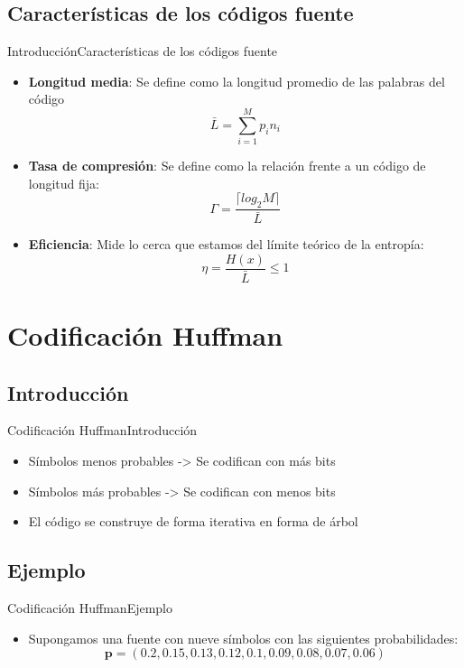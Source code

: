 \documentclass[10pt,compress]{beamer} %
\begin{document}
\subsection{Características de los códigos fuente}
\begin{frame}{Introducción}{Características de los códigos fuente}
  \begin{itemize}
    \item {\bf Longitud media}: Se define como la longitud promedio de las palabras del código
    \begin{displaymath}
      \bar{L} = \sum_{i=1}^M p_i n_i	
    \end{displaymath}
    \item {\bf Tasa de compresión}: Se define como la relación frente a un código de longitud fija:
    \begin{displaymath}
      \Gamma = \frac{\lceil log_2 M \rceil}{\bar{L}}	
    \end{displaymath}
    \item {\bf Eficiencia}: Mide lo cerca que estamos del límite teórico de la entropía:
    \begin{displaymath}
      \eta = \frac{H(x)}{\bar{L}} \leq 1	
    \end{displaymath}
  \end{itemize}
\end{frame}


\section{Codificación Huffman}
\subsection{Introducción}

\begin{frame}{Codificación Huffman}{Introducción}
  \begin{itemize}
    \item Símbolos menos probables -> Se codifican con más bits
    \item Símbolos más probables -> Se codifican con menos bits
    \item El código se construye de forma iterativa en forma de árbol
  \end{itemize}
\end{frame}

\subsection{Ejemplo}
\begin{frame}{Codificación Huffman}{Ejemplo}
  \begin{itemize}
    \item Supongamos una fuente con nueve símbolos con las siguientes probabilidades:
    \begin{displaymath}
      \mathbf{p} = (0.2, 0.15, 0.13, 0.12, 0.1, 0.09, 0.08, 0.07, 0.06)
    \end{displaymath}
  \end{itemize}
\end{frame}
\end{document}
